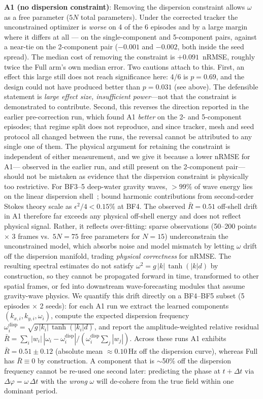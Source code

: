 \textbf{A1 (no dispersion constraint)}: Removing the dispersion constraint
allows $\omega$ as a free parameter ($5N$ total parameters).
Under the corrected tracker the unconstrained optimizer is
\emph{worse} on 4 of the 6 episodes and by a large margin where it differs
at all --- on the single-component and 5-component pairs,
against a near-tie on the 2-component pair ($-0.001$ and $-0.002$, both
inside the seed spread).  The median cost of removing the constraint is
$+0.091$~nRMSE, roughly twice the Full arm's own median error.
Two cautions attach to this.  First, an effect this large still does not
reach significance here: 4/6 is $p=0.69$, and the design could not have
produced better than $p=0.031$ (see above).  The defensible statement is
\emph{large effect size, insufficient power}---not that the constraint is
demonstrated to contribute.
Second, this reverses the direction reported in the earlier
pre-correction run, which found A1 \emph{better} on the 2- and
5-component episodes; that regime split does not reproduce, and since
tracker, mesh and seed protocol all changed between the runs, the reversal
cannot be attributed to any single one of them.
The physical argument for retaining the constraint is independent of
either measurement, and we give it because a lower nRMSE for A1---%
observed in the earlier run, and still present on the 2-component
pair---should not be mistaken as evidence that the dispersion constraint
is physically too restrictive.  For BF3--5
deep-water gravity waves, $>99\%$ of wave energy lies on the linear
dispersion shell~\citep{holthuijsen2007}; bound harmonic
contributions from second-order Stokes theory scale as
$\epsilon^2/4 < 0.15\%$ at BF4.  The observed $\bar R = 0.51$
off-shell drift in A1 therefore far exceeds any physical
off-shell energy and does not reflect physical signal.
Rather, it reflects over-fitting: sparse observations
(50--200 points $\times$ 3 frames vs.\ $5N = 75$ free
parameters for $N = 15$) underconstrain the unconstrained model,
which absorbs noise and model mismatch by letting $\omega$ drift
off the dispersion manifold, trading \emph{physical correctness}
for nRMSE.  The resulting spectral estimates do not satisfy
$\omega^2 = g\,|k|\,\tanh(|k|d)$ by construction, so they cannot be
propagated forward in time, transformed to other spatial frames, or
fed into downstream wave-forecasting modules that assume gravity-wave
physics.
%
We quantify this drift directly on a BF4--BF5 subset
(5 episodes $\times$ 2 seeds): for each A1 run we extract the learned
components $(k_{x,i}, k_{y,i}, \omega_i)$, compute the expected
dispersion frequency $\omega_i^\text{disp} = \sqrt{g\,|k_i|\,\tanh(|k_i|d)}$,
and report the amplitude-weighted relative residual
$\bar R = \sum_i |w_i|\,|\omega_i - \omega_i^\text{disp}|
        / (\omega_i^\text{disp} \sum_j |w_j|)$.
Across these runs A1 exhibits $\bar R = 0.51 \pm 0.12$
(absolute mean $\approx 0.10$\,Hz off the dispersion curve),
whereas Full has $\bar R \equiv 0$ by construction.
A component that is $\sim$50\% off the dispersion frequency cannot
be re-used one second later: predicting the phase at $t+\Delta t$ via
$\Delta\varphi = \omega\,\Delta t$ with the \emph{wrong} $\omega$ will
de-cohere from the true field within one dominant period.

